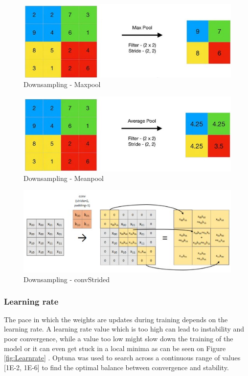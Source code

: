 \documentclass[twocolumn]{article}
\begin{document}
\begin{figure}
    \centering
    \includegraphics[width=1\linewidth]{Maxpool.jpg}
    \caption{Downsampling - Maxpool}
    \label{fig:maxpool}
\end{figure}

\begin{figure}
    \centering
    \includegraphics[width=1\linewidth]{Meanpool.jpg}
    \caption{Downsampling - Meanpool}
    \label{fig:meanpool}
\end{figure}

\begin{figure}
    \centering
    \includegraphics[width=1\linewidth]{ConvStrided.jpg}
    \caption{Downsampling - convStrided}
    \label{fig:convStrided}
\end{figure}

\subsubsection{Learning rate}
The pace in which the weights are updates during training depends on the learning rate. A learning rate value which is too high can lead to instability  and poor convergence, while a value too low might slow down the training of the model or it can even get stuck in a local minima as can be seen on Figure \ref{fig:Learnrate} \cite{jordan_2018_setting}. Optuna was used to search across a continuous range of values [1E-2, 1E-6] to find the optimal balance between convergence and stability.
\end{document}
